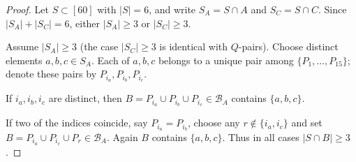 \documentclass[10pt,a4paper]{amsart}
\begin{document}
\begin{proof}
Let $S\subset[60]$ with $|S|=6$, and write $S_A=S\cap A$ and $S_C=S\cap C$.
Since $|S_A|+|S_C|=6$, either $|S_A|\ge 3$ or $|S_C|\ge 3$.

Assume $|S_A|\ge 3$ (the case $|S_C|\ge 3$ is identical with $Q$-pairs).
Choose distinct elements $a,b,c\in S_A$.
Each of $a,b,c$ belongs to a unique pair among $\{P_1,\dots,P_{15}\}$; denote these pairs by
$P_{i_a},P_{i_b},P_{i_c}$.

If $i_a,i_b,i_c$ are distinct, then
$B=P_{i_a}\cup P_{i_b}\cup P_{i_c}\in\mathcal{B}_A$ contains $\{a,b,c\}$.

If two of the indices coincide, say $P_{i_a}=P_{i_b}$, choose any $r\notin\{i_a,i_c\}$ and set
$B=P_{i_a}\cup P_{i_c}\cup P_r\in\mathcal{B}_A$.
Again $B$ contains $\{a,b,c\}$.
Thus in all cases $|S\cap B|\ge 3$.
\end{proof}
\end{document}
